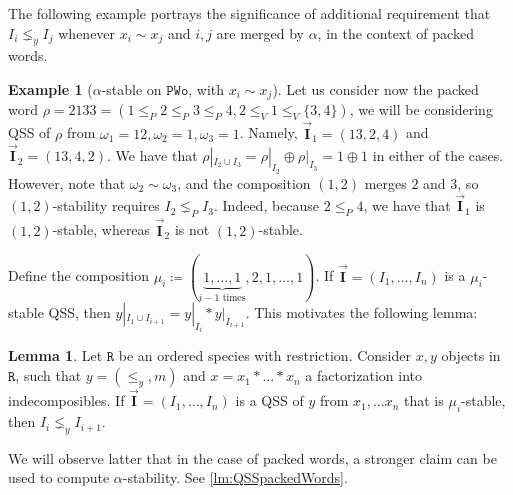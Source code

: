 \documentclass[12pt, reqno]{amsart}
\theoremstyle{definition}
\newtheorem{lm}[thm]{Lemma}
\newtheorem{smpl}[thm]{Example}
\newcommand{\III}{\vec{\mathbf{I}}}
\begin{document}
The following example portrays the significance of additional requirement that $I_i \lneq_y I_j$ whenever $x_i \sim x_j$ and $i, j$ are merged by $\alpha$, in the context of packed words.

\begin{smpl}[$\alpha$-stable on $\mathtt{PWo}$, with $x_i \sim x_j$]
Let us consider now the packed word $\rho = 2133 = (1 \leq_P 2 \leq_P 3 \leq_P 4, 2 \leq_V 1 \leq_V \{3, 4\} )$, we will be considering QSS of $\rho$ from $\omega_1 = 12, \omega_2 = 1, \omega_3 = 1$.
Namely, $\III_1 = (13, 2, 4)$ and $\III_2 = (13, 4, 2)$.
We have that $\rho|_{I_2 \cup I_3} = \rho|_{I_2} \oplus \rho|_{I_3} = 1 \oplus 1$ in either of the cases.
However, note that $\omega_2 \sim \omega_3$, and the composition $(1, 2)$ merges $2$ and $3$, so $(1, 2)$-stability requires $I_2 \lneq_P I_3$.
Indeed, because $2 \leq_P 4$, we have that $\III_1$ is $(1, 2)$-stable, whereas $\III_2$ is not $(1, 2)$-stable.
\end{smpl}


Define the composition $\mu_i \coloneqq (\underbrace{1, \dots , 1}_\text{$i-1$ times}, 2, 1, \dots, 1)$.
If $\III = (I_1, \dots, I_n)$  is a $\mu_i$-stable QSS, then $y|_{I_1 \cup I_{i+1}} = y|_{I_i} \ast y|_{I_{i+1}}$.
This motivates the following lemma:

\begin{lm}\label{obs:pwords-characterisation}
Let $\mathtt{R}$ be an ordered species with restriction.
Consider $x, y$ objects in $\mathtt{R}$, such that $y = (\leq_y, m)$ and $x = x_1\ast \dots \ast x_n$ a factorization into indecomposibles.
If $\III = (I_1, \dots, I_n)$ is a QSS of $y$ from $x_1, \dots x_n$ that is $\mu_i$-stable, then $I_i \lneq_y I_{i+1}$.
\end{lm}


We will observe latter that in the case of packed words, a stronger claim can be used to compute $\alpha$-stability.
See \cref{lm:QSSpackedWords}.
\end{document}
